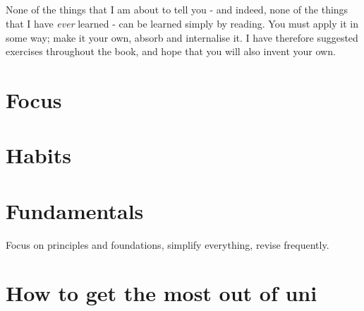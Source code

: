 \documentclass[11pt]{memoir}
\begin{document}
	\paragraph{}
	None of the things that I am about to tell you - and indeed, none of the things that
	I have \emph{ever} learned - can be learned simply by reading. You must apply it in 
	some way; make it your own, absorb and internalise it. I have therefore suggested 
	exercises throughout the book, and hope that you will also invent your own. 
	
	\mainmatter
	
	
	\chapter{Focus}
	
	\chapter{Habits}
	
	\chapter{Fundamentals}
	Focus on principles and foundations, simplify everything, revise frequently.
	
	\chapter{How to get the most out of uni}
	
	
\end{document}
